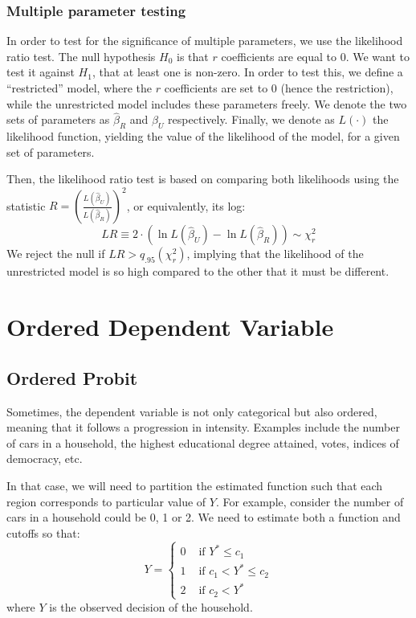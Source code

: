 \documentclass[12pt]{report}
\begin{document}
\subsubsection{Multiple parameter testing}

In order to test for the significance of multiple parameters, we use the likelihood ratio test. The null hypothesis $H_0$ is that $r$ coefficients are equal to 0. We want to test it against $H_1$, that at least one is non-zero. In order to test this, we define a ``restricted'' model, where the $r$ coefficients are set to 0 (hence the restriction), while the unrestricted model includes these parameters freely. We denote the two sets of parameters as $\hat\beta_R$ and $\hat\beta_U$ respectively. Finally, we denote as $L(\cdot)$ the likelihood function, yielding the value of the likelihood of the model, for a given set of parameters.

Then, the likelihood ratio test is based on comparing both likelihoods using the statistic $R = \left(\frac{L(\hat\beta_U)}{L(\hat\beta_R)}\right)^2$, or equivalently, its log: $$ LR \equiv 2 \cdot \left( \ln L(\hat\beta_U) - \ln L(\hat\beta_R) \right) \sim \chi_r^2 $$ We reject the null if $LR > q_{.95}(\chi_r^2)$, implying that the likelihood of the unrestricted model is so high compared to the other that it must be different.

\section{Ordered Dependent Variable}

\subsection{Ordered Probit}

Sometimes, the dependent variable is not only categorical but also ordered, meaning that it follows a progression in intensity. Examples include the number of cars in a household, the highest educational degree attained, votes, indices of democracy, etc.

In that case, we will need to partition the estimated function such that each region corresponds to particular value of $Y$. For example, consider the number of cars in a household could be 0, 1 or 2. We need to estimate both a function and cutoffs so that: $$Y = \begin{cases}
0 & \text{ if } Y^* \leq c_1 \\
1 & \text{ if } c_1 < Y^* \leq c_2 \\
2 & \text{ if } c_2 < Y^*
\end{cases} $$ where $Y$ is the observed decision of the household.
\end{document}
